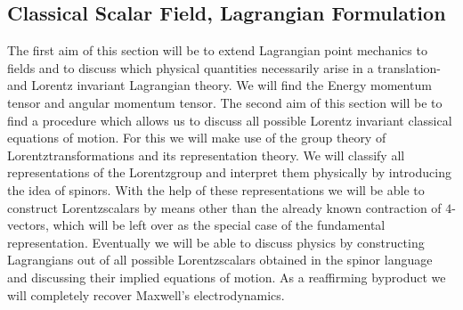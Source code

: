 \subsection{Classical Scalar Field, Lagrangian Formulation}
The first aim of this section will be to extend Lagrangian point mechanics to fields and to discuss which physical quantities necessarily arise in a translation- and Lorentz invariant Lagrangian theory. We will find the Energy momentum tensor and angular momentum tensor.
The second aim of this section will be to find a procedure which allows us to discuss all possible
Lorentz invariant classical equations of motion. For this we will make use of the group theory of
Lorentztransformations and its representation theory. We will classify all representations of the
Lorentzgroup and interpret them physically by introducing the idea of spinors. With the help of
these representations we will be able to construct Lorentzscalars by means other than the already
known contraction of $4$-vectors, which will be left over as the special case of the fundamental representation. Eventually we will be able to discuss physics by constructing Lagrangians out of all
possible Lorentzscalars obtained in the spinor language and discussing their implied equations of
motion. As a reaffirming byproduct we will completely recover Maxwell’s electrodynamics.












